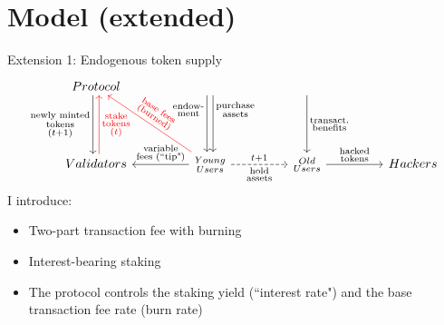 \documentclass{beamer}
\begin{document}
\section{Model (extended)}
\begin{frame}{Extension 1: Endogenous token supply}
\[
\begin{tikzcd}[ampersand replacement=\&, column sep = 4.5em, row sep = 4.5em]
Protocol 
\ar[d, shift right, "\substack{\text{newly minted}\\\text{tokens}\\(t+1)}" ']
\&
\ar[d, shift right, "\substack{\text{endow-}\\\text{ment}}" 'near start]
\ar[d, shift left, "\substack{\text{purchase}\\ \text{assets}}" near start]
\&
\ar[d, "\substack{\text{transact.}\\ \text{benefits}}" ]
\&
\\
Validators
\ar[u, shift right, red, "\substack{\text{stake}\\\text{tokens}\\(t)}" ' red ]
\& 
\substack{Young\\Users}
\ar[l,"\substack{\text{variable}\\ \text{fees (``tip")}}" ']
\ar[lu, red, "\substack{\text{base fees}\\ \text{(burned)}}" {sloped,auto}' red]
\ar[r, dashed, "t+1", 
"\substack{\text{hold}\\\text{assets}}" ']
\& 
\substack{Old\\Users}
\ar[r, "\substack{\text{hacked}\\ \text{tokens}}"]
\&
Hackers
\end{tikzcd}
\]
I introduce:
\begin{itemize}
    \item Two-part transaction fee with burning
    \item Interest-bearing staking
    \item The protocol controls the staking yield (``interest rate") and the base transaction fee rate (burn rate)
\end{itemize}
\end{frame}
\end{document}
